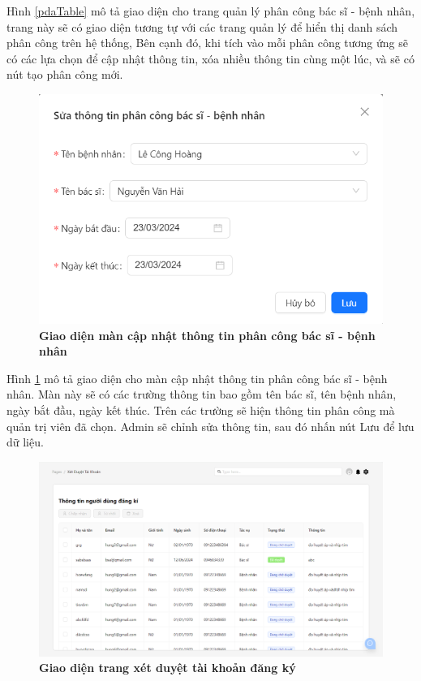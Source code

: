 Hình \ref{pdaTable} mô tả giao diện cho trang quản lý phân công bác sĩ - bệnh nhân, trang này sẽ có giao diện tương tự với các trang quản lý để hiển thị danh sách phân công trên hệ thống, 
Bên cạnh đó, khi tích vào mỗi phân công tương ứng sẽ có các lựa chọn để cập nhật thông tin, xóa nhiều thông tin cùng một lúc, và sẽ có nút tạo phân công mới. 

\begin{figure}[H]
  \centering
  \includegraphics[scale=0.7]{Images/server/webUI/editPDA.png}
  \caption[Giao diện màn cập nhật thông tin phân công bác sĩ - bệnh nhân]{\bfseries \fontsize{12pt}{0pt}\selectfont Giao diện màn cập nhật thông tin phân công bác sĩ - bệnh nhân}
  \label{editPDA} %
\end{figure}

Hình \ref{editPDA} mô tả giao diện cho màn cập nhật thông tin phân công bác sĩ - bệnh nhân. Màn này sẽ có các trường thông tin bao gồm 
tên bác sĩ, tên bệnh nhân, ngày bắt đầu, ngày kết thúc. Trên các trường sẽ hiện thông tin phân công mà quản trị viên đã chọn. 
Admin sẽ chỉnh sửa thông tin, sau đó nhấn nút Lưu để lưu dữ liệu.

\begin{figure}[H]
  \centering
  \includegraphics[scale=0.5]{Images/server/webUI/registerTable.png}
  \caption[Giao diện trang quản lý phê duyệt tài khoản]{\bfseries \fontsize{12pt}{0pt}\selectfont Giao diện trang xét duyệt tài khoản đăng ký}
  \label{registerTable} %
\end{figure}

